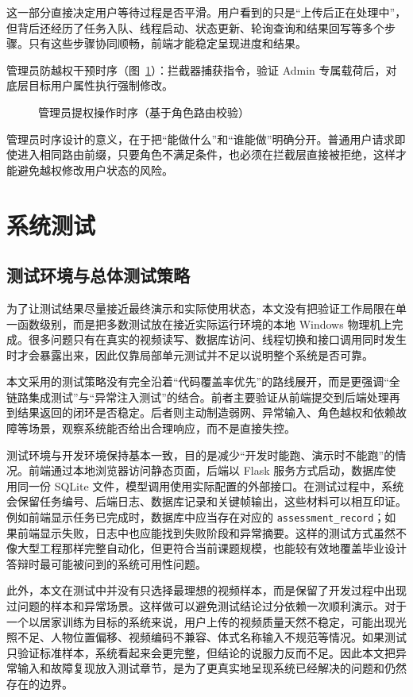 这一部分直接决定用户等待过程是否平滑。用户看到的只是“上传后正在处理中”，但背后还经历了任务入队、线程启动、状态更新、轮询查询和结果回写等多个步骤。只有这些步骤协同顺畅，前端才能稳定呈现进度和结果。

管理员防越权干预时序（图~\ref{fig:admin_seq}）：拦截器捕获指令，验证 Admin 专属载荷后，对底层目标用户属性执行强制修改。

\begin{figure}[!htbp]
  \centering
  \YogaAdminSequenceTikZ
  \caption{管理员提权操作时序（基于角色路由校验）}
  \label{fig:admin_seq}
\end{figure}

管理员时序设计的意义，在于把“能做什么”和“谁能做”明确分开。普通用户请求即使进入相同路由前缀，只要角色不满足条件，也必须在拦截层直接被拒绝，这样才能避免越权修改用户状态的风险。


\chapter{系统测试}

\section{测试环境与总体测试策略}
为了让测试结果尽量接近最终演示和实际使用状态，本文没有把验证工作局限在单一函数级别，而是把多数测试放在接近实际运行环境的本地 Windows 物理机上完成。很多问题只有在真实的视频读写、数据库访问、线程切换和接口调用同时发生时才会暴露出来，因此仅靠局部单元测试并不足以说明整个系统是否可靠。

本文采用的测试策略没有完全沿着“代码覆盖率优先”的路线展开，而是更强调“全链路集成测试”与“异常注入测试”的结合。前者主要验证从前端提交到后端处理再到结果返回的闭环是否稳定。后者则主动制造弱网、异常输入、角色越权和依赖故障等场景，观察系统能否给出合理响应，而不是直接失控。

测试环境与开发环境保持基本一致，目的是减少“开发时能跑、演示时不能跑”的情况。前端通过本地浏览器访问静态页面，后端以 Flask 服务方式启动，数据库使用同一份 SQLite 文件，模型调用使用实际配置的外部接口。在测试过程中，系统会保留任务编号、后端日志、数据库记录和关键帧输出，这些材料可以相互印证。例如前端显示任务已完成时，数据库中应当存在对应的 \texttt{assessment\_record}；如果前端显示失败，日志中也应能找到失败阶段和异常摘要。这样的测试方式虽然不像大型工程那样完整自动化，但更符合当前课题规模，也能较有效地覆盖毕业设计答辩时最可能被问到的系统可用性问题。

此外，本文在测试中并没有只选择最理想的视频样本，而是保留了开发过程中出现过问题的样本和异常场景。这样做可以避免测试结论过分依赖一次顺利演示。对于一个以居家训练为目标的系统来说，用户上传的视频质量天然不稳定，可能出现光照不足、人物位置偏移、视频编码不兼容、体式名称输入不规范等情况。如果测试只验证标准样本，系统看起来会更完整，但结论的说服力反而不足。因此本文把异常输入和故障复现放入测试章节，是为了更真实地呈现系统已经解决的问题和仍然存在的边界。

